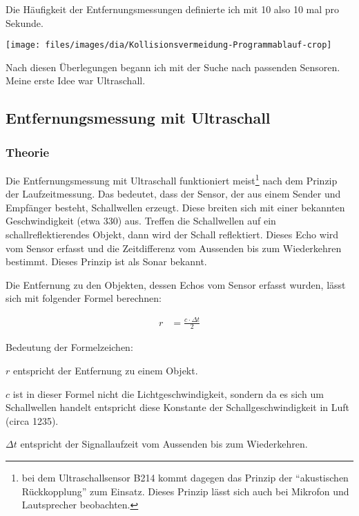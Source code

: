 Die Häufigkeit der Entfernungsmessungen definierte ich mit
\unit{10}{\hertz} also 10 mal pro Sekunde.

\begin{figurewrapper}
        \texttt{[image: files/images/dia/Kollisionsvermeidung-Programmablauf-crop]}
        \label{fig:Programmablauf}
\end{figurewrapper}

Nach diesen Überlegungen begann ich mit der Suche nach passenden Sensoren.
Meine erste Idee war Ultraschall.

\subsection{Entfernungsmessung mit Ultraschall}
\subsubsection{Theorie}
Die Entfernungsmessung mit Ultraschall funktioniert
meist\footnote{bei dem Ultraschallsensor B214
kommt dagegen das Prinzip
der \enquote{akustischen Rückkopplung} zum Einsatz.
Dieses Prinzip lässt sich auch bei Mikrofon und Lautsprecher beobachten.}
nach dem Prinzip der Laufzeitmessung.
Das bedeutet, dass der Sensor, der aus einem Sender und Empfänger besteht,
Schallwellen erzeugt.
Diese breiten sich mit einer bekannten Geschwindigkeit (etwa \unit{330}{\metre\per\second}) aus.
Treffen die Schallwellen auf ein schallreflektierendes Objekt,
dann wird der Schall reflektiert.
Dieses Echo wird vom Sensor erfasst
und die Zeitdifferenz vom Aussenden bis zum Wiederkehren bestimmt.
Dieses Prinzip ist als Sonar bekannt.

Die Entfernung zu den Objekten, dessen Echos vom Sensor erfasst wurden,
lässt sich mit folgender Formel berechnen:

\begin{align}
	r &= \frac{c\cdot \Delta t}{2}
\end{align}

Bedeutung der Formelzeichen:
\begin{eqlist}
	\item[$r$] entspricht der Entfernung zu einem Objekt.
	\item[$c$] ist in dieser Formel nicht die Lichtgeschwindigkeit,
		sondern da es sich um Schallwellen handelt entspricht diese
		Konstante der Schallgeschwindigkeit in Luft
		(circa \unit{1235}{\kilo\metre\per\hour}).
	\item[$\Delta t$] entspricht der Signallaufzeit
		vom Aussenden bis zum Wiederkehren.
\end{eqlist}

